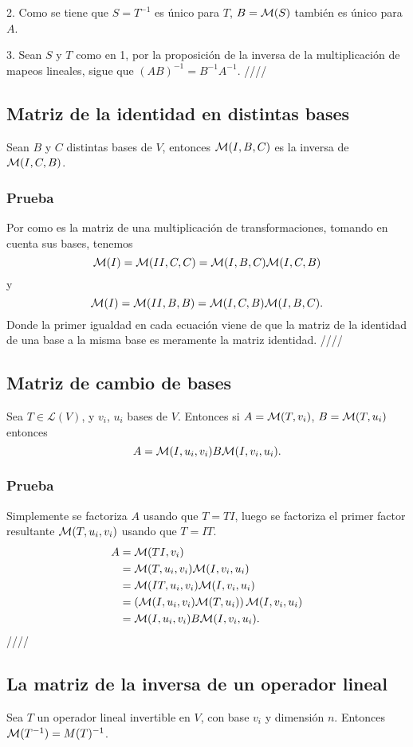 \documentclass{article}
\begin{document}
2. Como se tiene que $S=T^{-1}$ es único para $T$, $B=\mathcal{M}(S)$ también
es único para $A$.

3. Sean $S$ y $T$ como en 1, por la proposición de la inversa
de la multiplicación de mapeos lineales, sigue que
$(AB)^{-1} = B^{-1}A^{-1}$.
\hfill ////

\subsection{Matriz de la identidad en distintas bases}
Sean $B$ y $C$ distintas bases de $V$, entonces
$\mathcal{M}(I,B,C)$ es la inversa de\\
$\mathcal{M}(I,C,B)$.
\subsubsection*{Prueba}
Por como es la matriz de una multiplicación de transformaciones,
tomando en cuenta sus bases, tenemos
$$\mathcal{M}(I)=\mathcal{M}(II,C,C) = \mathcal{M}(I,B,C) \mathcal{M}(I,C,B)$$
y
$$\mathcal{M}(I)=\mathcal{M}(II,B,B) = \mathcal{M}(I,C,B) \mathcal{M}(I,B,C).$$
Donde la primer igualdad en cada ecuación viene de que la matriz
de la identidad de una base a la misma base es meramente la matriz
identidad. \hfill ////
\newpage

\subsection{Matriz de cambio de bases}
Sea $T\in\mathcal{L}(V)$, y $v_i$, $u_i$ bases de $V$.
Entonces si $A=\mathcal{M}(T,v_i)$, $B=\mathcal{M}(T,u_i)$
entonces
$$A=\mathcal{M}(I,u_i, v_i)B\mathcal{M}(I,v_i,u_i).$$
\subsubsection*{Prueba}
Simplemente se factoriza $A$ usando que $T=TI$,
luego se factoriza el primer factor resultante $\mathcal{M}(T, u_i, v_i)$
usando que $T=IT$.
\begin{align*}
    A&=\mathcal{M}(TI,v_i)\\
    &=\mathcal{M}(T, u_i, v_i)\mathcal{M}(I, v_i, u_i)\\
    &=\mathcal{M}(IT, u_i, v_i)\mathcal{M}(I, v_i, u_i)\\
    &=\left(\mathcal{M}(I, u_i, v_i)\mathcal{M}(T,u_i)\right)\mathcal{M}(I, v_i, u_i)\\
    &=\mathcal{M}(I, u_i, v_i)B\mathcal{M}(I, v_i, u_i).
\end{align*}
\hfill ////

\subsection{La matriz de la inversa de un operador lineal}
Sea $T$ un operador lineal invertible en $V$, con base $v_i$ y
dimensión $n$. Entonces $\mathcal{M}(T^{-1}) = M(T)^{-1}$.
\end{document}
